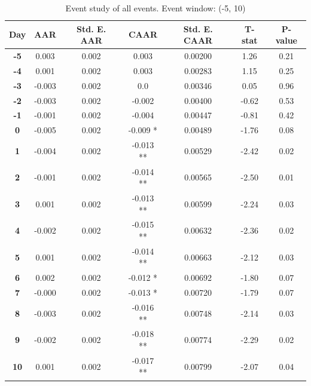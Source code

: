 \begin{table}[h]
    \centering
    \caption{Event study of all events. Event window: (-5, 10)}
    \label{tab:esAll}
    \begin{tabular}{|c|c|c|c|c|c|c|}
        \hline
        \textbf{Day} & \textbf{AAR} & \textbf{Std. E. AAR} & \textbf{CAAR} & \textbf{Std. E. CAAR} & \textbf{T-stat} & \textbf{P-value} \\
        \hline
        \textbf{-5} & 0.003 & 0.002 & 0.003 & 0.00200 & 1.26 & 0.21 \\
        \hline
        \textbf{-4} & 0.001 & 0.002 & 0.003 & 0.00283 & 1.15 & 0.25 \\
        \hline
        \textbf{-3} & -0.003 & 0.002 & 0.0 & 0.00346 & 0.05 & 0.96 \\
        \hline
        \textbf{-2} & -0.003 & 0.002 & -0.002 & 0.00400 & -0.62 & 0.53 \\
        \hline
        \textbf{-1} & -0.001 & 0.002 & -0.004 & 0.00447 & -0.81 & 0.42 \\
        \hline
        \textbf{0} & -0.005 & 0.002 & -0.009 * & 0.00489 & -1.76 & 0.08 \\
        \hline
        \textbf{1} & -0.004 & 0.002 & -0.013 ** & 0.00529 & -2.42 & 0.02 \\
        \hline
        \textbf{2} & -0.001 & 0.002 & -0.014 ** & 0.00565 & -2.50 & 0.01 \\
        \hline
        \textbf{3} & 0.001 & 0.002 & -0.013 ** & 0.00599 & -2.24 & 0.03 \\
        \hline
        \textbf{4} & -0.002 & 0.002 & -0.015 ** & 0.00632 & -2.36 & 0.02 \\
        \hline
        \textbf{5} & 0.001 & 0.002 & -0.014 ** & 0.00663 & -2.12 & 0.03 \\
        \hline
        \textbf{6} & 0.002 & 0.002 & -0.012 * & 0.00692 & -1.80 & 0.07 \\
        \hline
        \textbf{7} & -0.000 & 0.002 & -0.013 * & 0.00720 & -1.79 & 0.07 \\
        \hline
        \textbf{8} & -0.003 & 0.002 & -0.016 ** & 0.00748 & -2.14 & 0.03 \\
        \hline
        \textbf{9} & -0.002 & 0.002 & -0.018 ** & 0.00774 & -2.29 & 0.02 \\
        \hline
        \textbf{10} & 0.001 & 0.002 & -0.017 ** & 0.00799 & -2.07 & 0.04 \\
        \hline

    \end{tabular}
\end{table}


